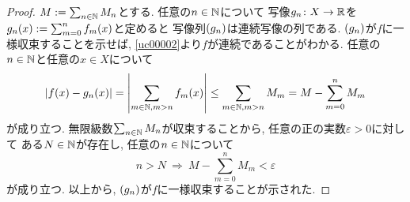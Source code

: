 \documentclass[uplatex, dvipdfmx, a4paper, 12pt, class=jsbook, crop=false]{standalone}
\begin{document}
\begin{proof}
	\( M \mathrel{:=} \sum_{n \in \mathbb{N}} M_n \)とする.
	任意の\( n \in \mathbb{N} \)について
	写像\( g_n\colon X\to\mathbb{R} \)を
	\( \mappt{g_n}{x} \defeq \sum_{m=0}^{n} \mappt{f_m}{x} \)と定めると
	写像列\( \lrparen{g_n} \)は連続写像の列である.
	\( \lrparen{g_n} \)が\( f \)に一様収束することを示せば,
	\cref{uc00002}より\( f \)が連続であることがわかる.
	任意の\( n \in \mathbb{N} \)と任意の\( x \in X \)について
	\[ \abs{\mappt{f}{x} - \mappt{g_n}{x}}
	= \abs{\sum_{m \in \N, m>n} \mappt{f_m}{x}}
	\leq \sum_{m \in \N, m>n} M_m = M - \sum_{m=0}^n M_m \]
	が成り立つ.
	無限級数\( \sum_{n \in \mathbb{N}} M_n \)が収束することから,
	任意の正の実数\( \varepsilon > 0 \)に対して
	ある\( N \in \mathbb{N} \)が存在し, 任意の\( n \in \mathbb{N} \)について
	\[ n > N \ \Longrightarrow \ M - \sum_{m=0}^n M_m < \varepsilon \]
	が成り立つ.
	以上から, \( \lrparen{g_n} \)が\( f \)に一様収束することが示された.
\end{proof}
\end{document}

